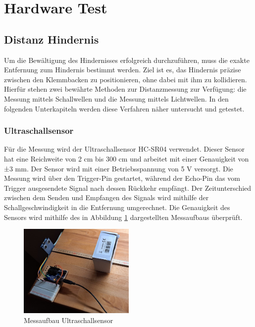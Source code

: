 \documentclass[../main.tex]{subfiles}
\begin{document}
\newpage
\section{Hardware Test}
\subsection{Distanz Hindernis}
Um die Bewältigung des Hindernisses erfolgreich durchzuführen, muss die exakte Entfernung zum Hindernis bestimmt werden. Ziel ist es, das Hindernis präzise zwischen den Klemmbacken zu positionieren, ohne dabei mit ihm zu kollidieren. Hierfür stehen zwei bewährte Methoden zur Distanzmessung zur Verfügung: die Messung mittels Schallwellen und die Messung mittels Lichtwellen. In den folgenden Unterkapiteln werden diese Verfahren näher untersucht und getestet.
\subsubsection{Ultraschallsensor}
Für die Messung wird der Ultraschallsensor HC-SR04 verwendet. Dieser Sensor hat eine Reichweite von 2 cm bis 300 cm und arbeitet mit einer Genauigkeit von ±3 mm. Der Sensor wird mit einer Betriebsspannung von 5 V versorgt. Die Messung wird über den Trigger-Pin gestartet, während der Echo-Pin das vom Trigger ausgesendete Signal nach dessen Rückkehr empfängt. Der Zeitunterschied zwischen dem Senden und Empfangen des Signals wird mithilfe der Schallgeschwindigkeit in die Entfernung umgerechnet. Die Genauigkeit des Sensors wird mithilfe des in Abbildung \ref{fig:Ultraschall1} dargestellten Messaufbaus überprüft.

\begin{figure}[h] %
    \centering
    \includegraphics[width=0.5\textwidth]{img/sensortest/MA_Ultraschall.jpg} %
    \caption{Messaufbau Ultraschallsensor}
    \label{fig:Ultraschall1} %
\end{figure}
\end{document}
